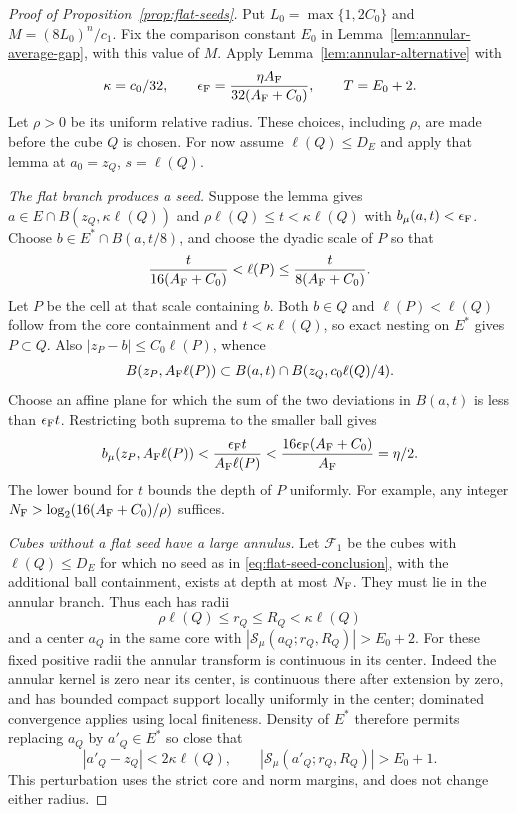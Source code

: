 \begin{proof}[Proof of Proposition~\ref{prop:flat-seeds}]
Put $L_0=\max\{1,2C_0\}$ and $M=(8L_0)^n/c_1$.
Fix the comparison constant $E_0$ in
Lemma~\ref{lem:annular-average-gap}, with this value of $M$.
Apply Lemma~\ref{lem:annular-alternative} with
\[
 \kappa=c_0/32,\qquad
 \epsilon_{\rm F}=\frac{\eta A_{\rm F}}{32(A_{\rm F}+C_0)},
 \qquad T=E_0+2.
\]
Let $\rho>0$ be its uniform relative radius. These choices, including
$\rho$, are made before the cube $Q$ is chosen. For now assume
$\ell(Q)\le D_E$ and apply that lemma at $a_0=z_Q$, $s=\ell(Q)$.

\smallskip\noindent
\emph{The flat branch produces a seed.}
Suppose the lemma gives $a\in E\cap B(z_Q,\kappa\ell(Q))$ and
$\rho\ell(Q)\le t<\kappa\ell(Q)$ with $b_\mu(a,t)<\epsilon_{\rm F}$.
Choose $b\in E^*\cap B(a,t/8)$, and choose the dyadic scale of $P$ so that
\[
 \frac{t}{16(A_{\rm F}+C_0)}<\ell(P)
 \le\frac{t}{8(A_{\rm F}+C_0)}.
\]
Let $P$ be the cell at that scale containing $b$.
Both $b\in Q$ and $\ell(P)<\ell(Q)$ follow from the core containment
and $t<\kappa\ell(Q)$, so exact nesting on $E^*$ gives $P\subset Q$.
Also $|z_P-b|\le C_0\ell(P)$, whence
\[
 B(z_P,A_{\rm F}\ell(P))\subset B(a,t)
 \cap B(z_Q,c_0\ell(Q)/4).
\]
Choose an affine plane for which the sum of the two deviations in
$B(a,t)$ is less than $\epsilon_{\rm F}t$. Restricting both suprema to
the smaller ball gives
\[
 b_\mu(z_P,A_{\rm F}\ell(P))
 <\frac{\epsilon_{\rm F}t}{A_{\rm F}\ell(P)}
 <\frac{16\epsilon_{\rm F}(A_{\rm F}+C_0)}{A_{\rm F}}
 =\eta/2.
\]
The lower bound for $t$ bounds the depth of $P$ uniformly. For example,
any integer $N_{\rm F}>\log_2(16(A_{\rm F}+C_0)/\rho)$ suffices.

\smallskip\noindent
\emph{Cubes without a flat seed have a large annulus.}
Let $\mathcal F_1$ be the cubes with $\ell(Q)\le D_E$ for which no seed
as in \eqref{eq:flat-seed-conclusion}, with the additional ball
containment, exists at depth at most $N_{\rm F}$. They must lie in the
annular branch. Thus each has radii
\[
 \rho\ell(Q)\le r_Q\le R_Q<\kappa\ell(Q)
\]
and a center $a_Q$ in the same core with
$|\mathcal S_\mu(a_Q;r_Q,R_Q)|>E_0+2$.
For these fixed positive radii the annular transform is continuous in
its center. Indeed the annular kernel is zero near its center, is
continuous there after extension by zero, and has bounded compact
support locally uniformly in the center; dominated convergence applies
using local finiteness. Density of $E^*$ therefore permits replacing
$a_Q$ by $a'_Q\in E^*$ so close that
\[
 |a'_Q-z_Q|<2\kappa\ell(Q),\qquad
 |\mathcal S_\mu(a'_Q;r_Q,R_Q)|>E_0+1.
\]
This perturbation uses the strict core and norm margins, and does not
change either radius.


\end{proof}
